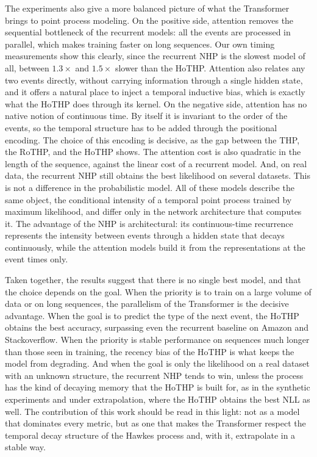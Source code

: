 The experiments also give a more balanced picture of what the Transformer brings to point process modeling. On the positive side, attention removes the sequential bottleneck of the recurrent models: all the events are processed in parallel, which makes training faster on long sequences. Our own timing measurements show this clearly, since the recurrent NHP is the slowest model of all, between $1.3\times$ and $1.5\times$ slower than the HoTHP. Attention also relates any two events directly, without carrying information through a single hidden state, and it offers a natural place to inject a temporal inductive bias, which is exactly what the HoTHP does through its kernel. On the negative side, attention has no native notion of continuous time. By itself it is invariant to the order of the events, so the temporal structure has to be added through the positional encoding. The choice of this encoding is decisive, as the gap between the THP, the RoTHP, and the HoTHP shows. The attention cost is also quadratic in the length of the sequence, against the linear cost of a recurrent model. And, on real data, the recurrent NHP still obtains the best likelihood on several datasets. This is not a difference in the probabilistic model. All of these models describe the same object, the conditional intensity of a temporal point process trained by maximum likelihood, and differ only in the network architecture that computes it. The advantage of the NHP is architectural: its continuous-time recurrence represents the intensity between events through a hidden state that decays continuously, while the attention models build it from the representations at the event times only.

Taken together, the results suggest that there is no single best model, and that the choice depends on the goal. When the priority is to train on a large volume of data or on long sequences, the parallelism of the Transformer is the decisive advantage. When the goal is to predict the type of the next event, the HoTHP obtains the best accuracy, surpassing even the recurrent baseline on Amazon and Stackoverflow. When the priority is stable performance on sequences much longer than those seen in training, the recency bias of the HoTHP is what keeps the model from degrading. And when the goal is only the likelihood on a real dataset with an unknown structure, the recurrent NHP tends to win, unless the process has the kind of decaying memory that the HoTHP is built for, as in the synthetic experiments and under extrapolation, where the HoTHP obtains the best NLL as well. The contribution of this work should be read in this light: not as a model that dominates every metric, but as one that makes the Transformer respect the temporal decay structure of the Hawkes process and, with it, extrapolate in a stable way.

